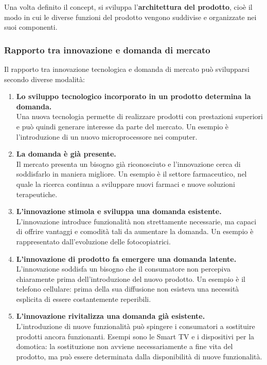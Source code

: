 \noindent Una volta definito il concept, si sviluppa l'\textbf{architettura del prodotto}, cioè il modo in cui le diverse funzioni del prodotto 
vengono suddivise e organizzate nei suoi componenti.

\subsubsection*{Rapporto tra innovazione e domanda di mercato}

\noindent Il rapporto tra innovazione tecnologica e domanda di mercato può svilupparsi secondo diverse modalità:

\begin{enumerate}
    \item \textbf{Lo sviluppo tecnologico incorporato in un prodotto determina la domanda.}\\
    Una nuova tecnologia permette di realizzare prodotti con prestazioni superiori e può quindi generare interesse da parte del mercato. Un esempio è 
    l'introduzione di un nuovo microprocessore nei computer.

    \item \textbf{La domanda è già presente.}\\
    Il mercato presenta un bisogno già riconosciuto e l'innovazione cerca di soddisfarlo in maniera migliore. Un esempio è il settore farmaceutico, 
    nel quale la ricerca continua a sviluppare nuovi farmaci e nuove soluzioni terapeutiche.

    \item \textbf{L'innovazione stimola e sviluppa una domanda esistente.}\\
    L'innovazione introduce funzionalità non strettamente necessarie, ma capaci di offrire vantaggi e comodità tali da aumentare la domanda. 
    Un esempio è rappresentato dall'evoluzione delle fotocopiatrici.

    \item \textbf{L'innovazione di prodotto fa emergere una domanda latente.}\\
    L'innovazione soddisfa un bisogno che il consumatore non percepiva chiaramente prima dell'introduzione del nuovo prodotto. 
    Un esempio è il telefono cellulare: prima della sua diffusione non esisteva una necessità esplicita di essere costantemente reperibili.

    \item \textbf{L'innovazione rivitalizza una domanda già esistente.}\\
    L'introduzione di nuove funzionalità può spingere i consumatori a sostituire prodotti ancora funzionanti. 
    Esempi sono le Smart TV e i dispositivi per la domotica: la sostituzione non avviene necessariamente a fine vita del prodotto, ma può essere 
    determinata dalla disponibilità di nuove funzionalità.
\end{enumerate}

